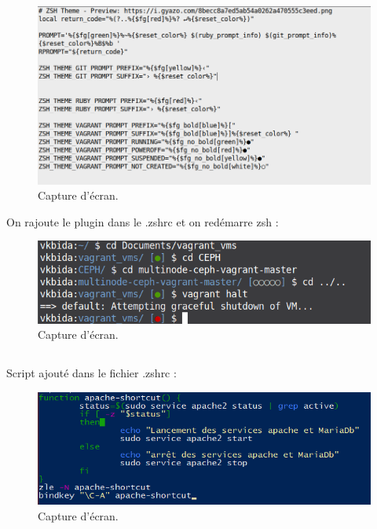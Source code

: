 \documentclass{article}
\begin{document}
\begin{figure}[h]
\centering
\includegraphics[width=\textwidth]{images/q1-7-2.jpg}
\caption{\label{fig:frog}Capture d'écran.}
\end{figure}

On rajoute le plugin dans le .zshrc et on redémarre zsh :

\begin{figure}[h]
\centering
\includegraphics[width=\textwidth]{images/q1-7-3.jpg}
\caption{\label{fig:frog}Capture d'écran.}
\end{figure}

\subsection{}

Script ajouté dans le fichier .zshrc :

\begin{figure}[h]
\centering
\includegraphics[width=\textwidth]{images/q1-8.jpg}
\caption{\label{fig:frog}Capture d'écran.}
\end{figure}
\end{document}
